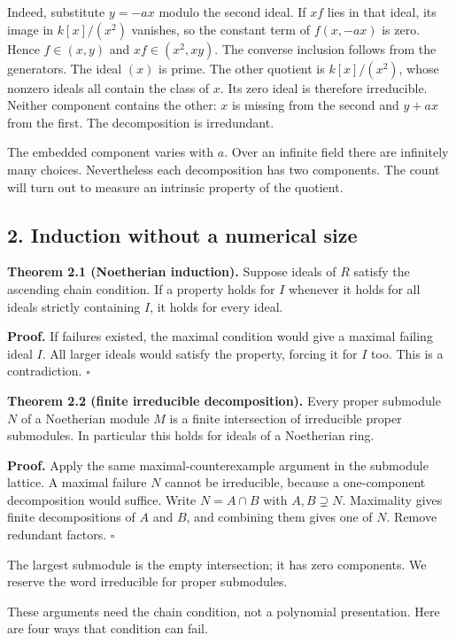 \documentclass[
]{article}
\begin{document}
Indeed, substitute \(y=-ax\) modulo the second ideal. If \(xf\) lies in
that ideal, its image in \(k[x]/(x^2)\) vanishes, so the constant term
of \(f(x,-ax)\) is zero. Hence \(f\in(x,y)\) and \(xf\in(x^2,xy)\). The
converse inclusion follows from the generators. The ideal \((x)\) is
prime. The other quotient is \(k[x]/(x^2)\), whose nonzero ideals all
contain the class of \(x\). Its zero ideal is therefore irreducible.
Neither component contains the other: \(x\) is missing from the second
and \(y+ax\) from the first. The decomposition is irredundant.

The embedded component varies with \(a\). Over an infinite field there
are infinitely many choices. Nevertheless each decomposition has two
components. The count will turn out to measure an intrinsic property of
the quotient.

\subsection{2. Induction without a numerical
size}\label{induction-without-a-numerical-size}

\textbf{Theorem 2.1 (Noetherian induction).} Suppose ideals of \(R\)
satisfy the ascending chain condition. If a property holds for \(I\)
whenever it holds for all ideals strictly containing \(I\), it holds for
every ideal.

\textbf{Proof.} If failures existed, the maximal condition would give a
maximal failing ideal \(I\). All larger ideals would satisfy the
property, forcing it for \(I\) too. This is a contradiction. \(\square\)

\textbf{Theorem 2.2 (finite irreducible decomposition).} Every proper
submodule \(N\) of a Noetherian module \(M\) is a finite intersection of
irreducible proper submodules. In particular this holds for ideals of a
Noetherian ring.

\textbf{Proof.} Apply the same maximal-counterexample argument in the
submodule lattice. A maximal failure \(N\) cannot be irreducible,
because a one-component decomposition would suffice. Write \(N=A\cap B\)
with \(A,B\supsetneq N\). Maximality gives finite decompositions of
\(A\) and \(B\), and combining them gives one of \(N\). Remove redundant
factors. \(\square\)

The largest submodule is the empty intersection; it has zero components.
We reserve the word irreducible for proper submodules.

These arguments need the chain condition, not a polynomial presentation.
Here are four ways that condition can fail.
\end{document}
